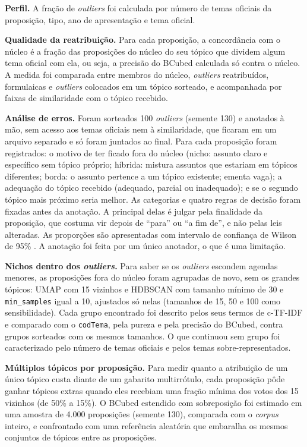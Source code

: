 \textbf{Perfil.} A fração de \textit{outliers} foi calculada por número de temas oficiais da proposição, tipo, ano de apresentação e tema oficial.

\textbf{Qualidade da reatribuição.} Para cada proposição, a concordância com o núcleo é a fração das proposições do núcleo do seu tópico que dividem algum tema oficial com ela, ou seja, a precisão do BCubed calculada só contra o núcleo. A medida foi comparada entre membros do núcleo, \textit{outliers} reatribuídos, formulaicas e \textit{outliers} colocados em um tópico sorteado, e acompanhada por faixas de similaridade com o tópico recebido.

\textbf{Análise de erros.} Foram sorteados 100 \textit{outliers} (semente 130) e anotados à mão, sem acesso aos temas oficiais nem à similaridade, que ficaram em um arquivo separado e só foram juntados ao final. Para cada proposição foram registrados: o motivo de ter ficado fora do núcleo (nicho: assunto claro e específico sem tópico próprio; híbrida: mistura assuntos que estariam em tópicos diferentes; borda: o assunto pertence a um tópico existente; ementa vaga); a adequação do tópico recebido (adequado, parcial ou inadequado); e se o segundo tópico mais próximo seria melhor. As categorias e quatro regras de decisão foram fixadas antes da anotação. A principal delas é julgar pela finalidade da proposição, que costuma vir depois de ``para'' ou ``a fim de'', e não pelas leis alteradas. As proporções são apresentadas com intervalo de confiança de Wilson de 95\% \citep{wilson1927probable}. A anotação foi feita por um único anotador, o que é uma limitação.

\textbf{Nichos dentro dos \textit{outliers}.} Para saber se os \textit{outliers} escondem agendas menores, as proposições fora do núcleo foram agrupadas de novo, sem os grandes tópicos: UMAP com 15 vizinhos e HDBSCAN com tamanho mínimo de 30 e \texttt{min\_samples} igual a 10, ajustados só nelas (tamanhos de 15, 50 e 100 como sensibilidade). Cada grupo encontrado foi descrito pelos seus termos de c-TF-IDF e comparado com o \texttt{codTema}, pela pureza e pela precisão do BCubed, contra grupos sorteados com os mesmos tamanhos. O que continuou sem grupo foi caracterizado pelo número de temas oficiais e pelos temas sobre-representados.

\textbf{Múltiplos tópicos por proposição.} Para medir quanto a atribuição de um único tópico custa diante de um gabarito multirrótulo, cada proposição pôde ganhar tópicos extras quando eles recebiam uma fração mínima dos votos dos 15 vizinhos (de 50\% a 15\%). O BCubed estendido com sobreposição foi estimado em uma amostra de 4.000 proposições (semente 130), comparada com o \textit{corpus} inteiro, e confrontado com uma referência aleatória que embaralha os mesmos conjuntos de tópicos entre as proposições.

